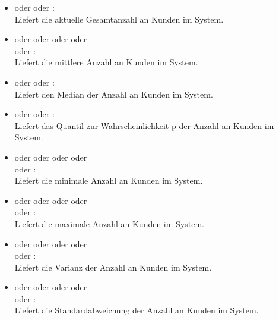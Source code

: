 \begin{itemize}

\item
{} oder  oder :\\
Liefert die aktuelle Gesamtanzahl an Kunden im System.

\item
{} oder  oder  oder  oder\\
 oder :\\
Liefert die mittlere Anzahl an Kunden im System.

\item
{} oder  oder :\\	
Liefert den Median der Anzahl an Kunden im System.

\item
{} oder  oder :\\
Liefert das Quantil zur Wahrscheinlichkeit p der Anzahl an Kunden im System.

\item
{} oder  oder  oder  oder\\
 oder :\\
Liefert die minimale Anzahl an Kunden im System.

\item
{} oder  oder  oder  oder\\
 oder :\\
Liefert die maximale Anzahl an Kunden im System.

\item
{} oder  oder  oder  oder\\
 oder :\\
Liefert die Varianz der Anzahl an Kunden im System.

\item
{} oder  oder  oder  oder\\
 oder :\\
Liefert die Standardabweichung der Anzahl an Kunden im System.


\end{itemize}

